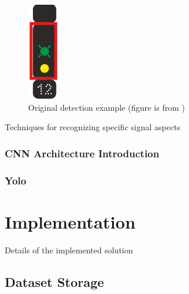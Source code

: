 \documentclass[english, ing, kiv, he, iso690alph, pdf, viewonly]{fasthesis}
\begin{document}
\begin{figure}[!ht]
    \centering
    \includegraphics[width=0.07\linewidth]{myimgs/example_roi.png}
    \caption{Original detection example (figure is from \cite{sprava_zeleznic_predpis})}
    \label{fig:original detection example}
\end{figure}


Techniques for recognizing specific signal aspects






\subsection{CNN Architecture Introduction}



\subsection{Yolo}





\chapter{Implementation}


Details of the implemented solution
\section{Dataset Storage}
\end{document}
